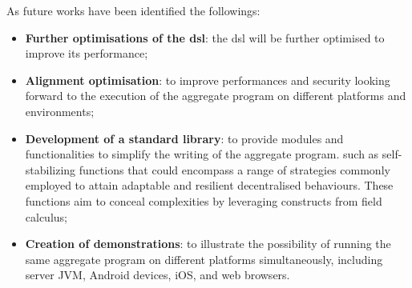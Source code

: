 As future works have been identified the followings:
\begin{itemize}
    \item \textbf{Further optimisations of the \ac{dsl}}: the \ac{dsl} will be further optimised to improve its performance;
    \item \textbf{Alignment optimisation}: to improve performances and security looking forward to the execution of the aggregate
        program on different platforms and environments;
    \item \textbf{Development of a standard library}: to provide modules and functionalities to simplify the writing of the aggregate program.
        such as self-stabilizing functions that could encompass a range of strategies commonly employed to attain adaptable
        and resilient decentralised behaviours.
        These functions aim to conceal complexities by leveraging constructs from field calculus;
    \item \textbf{Creation of demonstrations}: to illustrate the possibility of running the same aggregate program on
        different platforms simultaneously, including server JVM, Android devices, iOS, and web browsers.
\end{itemize}
